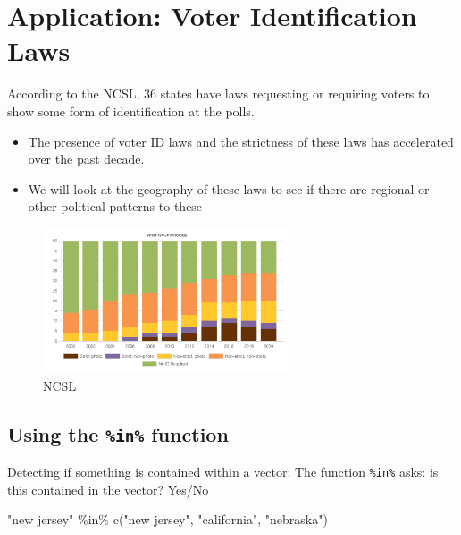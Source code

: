 \documentclass[
  letterpaper,
  DIV=11,
  numbers=noendperiod]{scrreprt}
\newenvironment{Shaded}{\begin{snugshade}}{\end{snugshade}}
\newcommand{\FunctionTok}[1]{\textcolor[rgb]{0.28,0.35,0.67}{#1}}
\newcommand{\NormalTok}[1]{\textcolor[rgb]{0.00,0.23,0.31}{#1}}
\newcommand{\SpecialCharTok}[1]{\textcolor[rgb]{0.37,0.37,0.37}{#1}}
\newcommand{\StringTok}[1]{\textcolor[rgb]{0.13,0.47,0.30}{#1}}
\providecommand{\tightlist}{%
  \setlength{\itemsep}{0pt}\setlength{\parskip}{0pt}}\usepackage{longtable,booktabs,array}
\begin{document}
\hypertarget{application-voter-identification-laws}{%
\section{Application: Voter Identification
Laws}\label{application-voter-identification-laws}}

According to the NCSL, 36 states have laws requesting or requiring
voters to show some form of identification at the polls.

\begin{itemize}
\tightlist
\item
  The presence of voter ID laws and the strictness of these laws has
  accelerated over the past decade.
\item
  We will look at the geography of these laws to see if there are
  regional or other political patterns to these
\end{itemize}

\begin{figure}

{\centering \includegraphics[width=0.65\textwidth,height=\textheight]{images/voteridc.png}

}

\caption{NCSL}

\end{figure}

\hypertarget{using-the-in-function}{%
\subsection{\texorpdfstring{Using the \texttt{\%in\%}
function}{Using the \%in\% function}}\label{using-the-in-function}}

Detecting if something is contained within a vector: The function
\texttt{\%in\%} asks: is this contained in the vector? Yes/No

\begin{Shaded}
\begin{Highlighting}[]
\StringTok{"new jersey"} \SpecialCharTok{\%in\%} \FunctionTok{c}\NormalTok{(}\StringTok{"new jersey"}\NormalTok{, }\StringTok{"california"}\NormalTok{, }\StringTok{"nebraska"}\NormalTok{)}
\end{Highlighting}
\end{Shaded}
\end{document}
